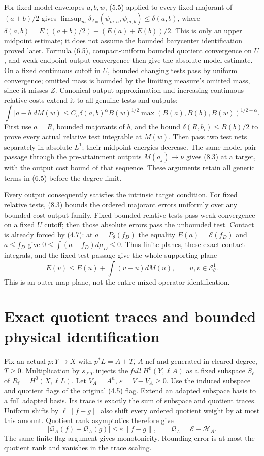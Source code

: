 \documentclass[10pt]{article}
\newcommand{\EE}{\mathcal E^1_\theta}
\begin{document}
For fixed model envelopes $a,b,w$, (5.5) applied to every fixed majorant
of $(a+b)/2$ gives
$\limsup_m\delta_{A_m}(\psi_{m,a},\psi_{m,b})\leq\delta(a,b)$,
where $\delta(a,b)=E((a+b)/2)-(E(a)+E(b))/2$.
This is only an upper midpoint estimate; it does not assume the bounded
barycenter identification proved later. Formula (6.5), compact-uniform
bounded quotient convergence on $U$, and weak endpoint output convergence
then give the absolute model estimate. On a fixed continuous cutoff in
$U$, bounded changing tests pass by uniform convergence; omitted mass
is bounded by the limiting measure's omitted mass, since it misses $Z$.
Canonical output approximation and increasing continuous relative costs
extend it to all genuine tests and outputs:
\[
 \int|a-b|dM(w)\leq
 C_n\delta(a,b)^\alpha B(w)^{1/2}
       \max(B(a),B(b),B(w))^{1/2-\alpha}.
 \tag{8.3}
\]
First use $a=R$, bounded majorants of $b$, and the bound
$\delta(R,b_i)\leq B(b)/2$ to prove every actual relative test
integrable at $M(w)$. Then pass two test nets separately in absolute
$L^1$; their midpoint energies decrease. The same model-pair passage
through the pre-attainment outputs $M(a_j)\to\nu$ gives (8.3) at a
target, with the output cost bound of that sequence. These arguments
retain all generic terms in (6.5) before the degree limit.

Every output consequently satisfies the intrinsic target condition.
For fixed relative tests, (8.3) bounds the ordered majorant errors
uniformly over any bounded-cost output family. Fixed bounded relative
tests pass weak convergence on a fixed $U$ cutoff; then those absolute
errors pass the unbounded test. Contact is already forced by (4.7): at
$a=P_\theta(f_D)$ the equality $E(a)=\mathscr E(f_D)$ and $a\leq f_D$
give $0\leq\int(a-f_D)d\mu_D\leq0$. Thus finite planes, these exact
contact integrals, and the fixed-test passage give the whole supporting plane
\[
 E(v)\leq E(u)+\int(v-u)dM(u),\qquad u,v\in\EE.
 \tag{8.4}
\]
This is an outer-map plane, not the entire mixed-operator identification.

\section{Exact quotient traces and bounded physical identification}
Fix an actual $p:Y\to X$ with $p^*L=A+T$, $A$ nef and generated in
cleared degree, $T\geq0$. Multiplication by $s_{\ell T}$ injects the
\emph{full} $H^0(Y,\ell A)$ as a fixed subspace $S_\ell$ of
$R_\ell=H^0(X,\ell L)$. Let $V_A=A^n$, $\varepsilon=V-V_A\geq0$.
Use the induced subspace and quotient flags of the original (4.5) flag.
Extend an adapted subspace basis to a full adapted basis. Its trace is
exactly the sum of subspace and quotient traces. Uniform shifts by
$\ell\|f-g\|$ also shift every ordered quotient weight by at most this
amount. Quotient rank asymptotics therefore give
\[
 |\mathscr Q_A(f)-\mathscr Q_A(g)|\leq\varepsilon\|f-g\|,
 \qquad\mathscr Q_A=\mathscr E-\mathscr H_A.
 \tag{9.1}
\]
The same finite flag argument gives monotonicity. Rounding error is at
most the quotient rank and vanishes in the trace scaling.
\end{document}
